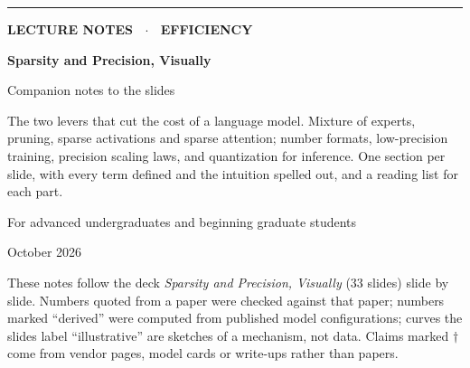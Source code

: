 \documentclass[11pt,letterpaper]{article}
\begin{document}
\begin{titlepage}
\thispagestyle{empty}
\vspace*{2.5cm}
{\color{attn}\rule{3cm}{3pt}}\par\vspace{0.6cm}
{\sffamily\bfseries\color{muted}\large LECTURE NOTES \ $\cdot$ \ EFFICIENCY\par}
\vspace{0.4cm}
{\sffamily\bfseries\fontsize{34}{38}\selectfont\color{ink} Sparsity and Precision, Visually\par}
\vspace{0.3cm}
{\sffamily\fontsize{18}{22}\selectfont\color{ink} Companion notes to the slides\par}
\vspace{1.2cm}
{\large\color{muted}\parbox{0.82\textwidth}{The two levers that cut the cost of a language model. Mixture of experts, pruning, sparse activations and sparse attention; number formats, low-precision training, precision scaling laws, and quantization for inference. One section per slide, with every term defined and the intuition spelled out, and a reading list for each part.}\par}
\vspace{1.5cm}
{\color{muted}For advanced undergraduates and beginning graduate students\par}
\vspace{0.3cm}
{\color{muted}October 2026\par}
\vfill
{\small\color{muted}\parbox{0.9\textwidth}{These notes follow the deck \textit{Sparsity and Precision, Visually} (33 slides) slide by slide. Numbers quoted from a paper were checked against that paper; numbers marked ``derived'' were computed from published model configurations; curves the slides label ``illustrative'' are sketches of a mechanism, not data. Claims marked $\dagger$ come from vendor pages, model cards or write-ups rather than papers.}\par}
\end{titlepage}

\tableofcontents
\clearpage

\end{document}
